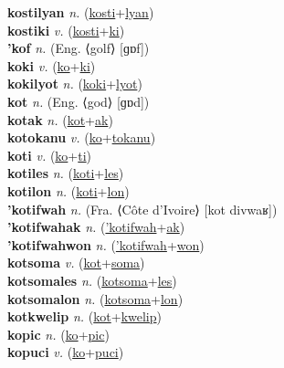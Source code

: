 \textbf{kostilyan} \textit{n.} (\hyperref[kosti]{kosti}+\hyperref[lyan]{lyan})
 \label{kostilyan} \\
\textbf{kostiki} \textit{v.} (\hyperref[kosti]{kosti}+\hyperref[ki]{ki})
 \label{kostiki} \\
\textbf{'kof} \textit{n.} (Eng. ⟨golf⟩ [ɡɒf])
 \label{'kof} \\
\textbf{koki} \textit{v.} (\hyperref[ko]{ko}+\hyperref[ki]{ki})
 \label{koki} \\
\textbf{kokilyot} \textit{n.} (\hyperref[koki]{koki}+\hyperref[lyot]{lyot})
 \label{kokilyot} \\
\textbf{kot} \textit{n.} (Eng. ⟨god⟩ [ɡɒd])
 \label{kot} \\
\textbf{kotak} \textit{n.} (\hyperref[kot]{kot}+\hyperref[ak]{ak})
 \label{kotak} \\
\textbf{kotokanu} \textit{v.} (\hyperref[ko]{ko}+\hyperref[tokanu]{tokanu})
 \label{kotokanu} \\
\textbf{koti} \textit{v.} (\hyperref[ko]{ko}+\hyperref[ti]{ti})
 \label{koti} \\
\textbf{kotiles} \textit{n.} (\hyperref[koti]{koti}+\hyperref[les]{les})
 \label{kotiles} \\
\textbf{kotilon} \textit{n.} (\hyperref[koti]{koti}+\hyperref[lon]{lon})
 \label{kotilon} \\
\textbf{'kotifwah} \textit{n.} (Fra. ⟨Côte d’Ivoire⟩ [kot divwaʁ])
 \label{'kotifwah} \\
\textbf{'kotifwahak} \textit{n.} (\hyperref['kotifwah]{'kotifwah}+\hyperref[ak]{ak})
 \label{'kotifwahak} \\
\textbf{'kotifwahwon} \textit{n.} (\hyperref['kotifwah]{'kotifwah}+\hyperref[won]{won})
 \label{'kotifwahwon} \\
\textbf{kotsoma} \textit{v.} (\hyperref[kot]{kot}+\hyperref[soma]{soma})
 \label{kotsoma} \\
\textbf{kotsomales} \textit{n.} (\hyperref[kotsoma]{kotsoma}+\hyperref[les]{les})
 \label{kotsomales} \\
\textbf{kotsomalon} \textit{n.} (\hyperref[kotsoma]{kotsoma}+\hyperref[lon]{lon})
 \label{kotsomalon} \\
\textbf{kotkwelip} \textit{n.} (\hyperref[kot]{kot}+\hyperref[kwelip]{kwelip})
 \label{kotkwelip} \\
\textbf{kopic} \textit{n.} (\hyperref[ko]{ko}+\hyperref[pic]{pic})
 \label{kopic} \\
\textbf{kopuci} \textit{v.} (\hyperref[ko]{ko}+\hyperref[puci]{puci})
 \label{kopuci} \\
